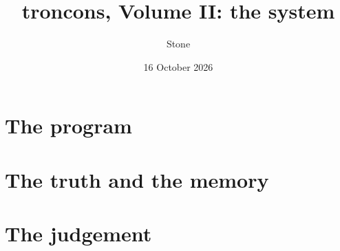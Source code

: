 \documentclass[11pt, a4paper, twoside, openright, parskip=false, headings=big,
               chapterprefix=true, numbers=noenddot, bibliography=totoc,
               listof=totoc]{scrbook}
\title{troncons, Volume II: the system}
\author{Stone}
\date{16 October 2026}
\newcommand{\Racine}{../..}               %
\begin{document}
\frontmatter


\tableofcontents
\listoffigures
\listoftables
\lstlistoflistings


\mainmatter


\part{The program}





\part{The truth and the memory}



\part{The judgement}




\appendix



\backmatter

\end{document}
